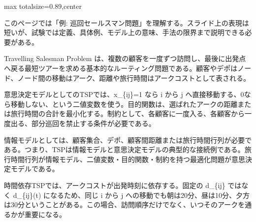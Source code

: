\begin{minipage}[t]{0.58\textwidth}
\begin{adjustbox}{max totalsize={\textwidth}{0.89\textheight},center}
\begin{minipage}{\textwidth}\scriptsize
{}このページでは「例: 巡回セールスマン問題」を理解する。スライド上の表現は短いが、試験では定義、具体例、モデル上の意味、手法の限界まで説明できる必要がある。\par
Travelling Salesman Problem は、複数の顧客を一度ずつ訪問し、最後に出発点へ戻る最短ツアーを求める基本的なルーティング問題である。顧客やデポはノード、ノード間の移動はアーク、距離や旅行時間はアークコストとして表される。\par
意思決定モデルとしてのTSPでは、x\_\{ij\}=1 なら i から j へ直接移動する、0なら移動しない、という二値変数を使う。目的関数は、選ばれたアークの距離または旅行時間の合計を最小化する。制約として、各顧客に一度入る、各顧客から一度出る、部分巡回を禁止する条件が必要である。\par
情報モデルとしては、顧客集合、デポ、顧客間距離または旅行時間行列が必要である。つまり、TSPは情報モデルと意思決定モデルの典型的な接続例である。旅行時間行列が情報モデル、二値変数・目的関数・制約を持つ最適化問題が意思決定モデルである。\par
時間依存TSPでは、アークコストが出発時刻に依存する。固定の d\_\{ij\} ではなく d\_\{ij\}(t) になるため、同じ i から j への移動でも朝は20分、昼は10分、夕方は30分ということがある。この場合、訪問順序だけでなく、いつそのアークを通るかが重要になる。\par

\end{minipage}
\end{adjustbox}
\end{minipage}
